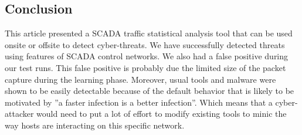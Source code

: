 \documentclass[12pt,journal,compsoc]{IEEEtran}
\begin{document}
\begin{empfile}
%





\section{Conclusion}
This article presented a SCADA traffic statistical analysis tool that can be used onsite or offsite to detect cyber-threats. We have successfully detected threats using features of SCADA control networks. We also had a false positive during our test runs. This false positive is probably due the limited size of the packet capture during the learning phase. Moreover, usual tools and malware were shown to be easily detectable because of the default behavior that is likely to be motivated by ''a faster infection is a better infection''. Which means that a cyber-attacker would need to put a lot of effort to modify existing tools to minic the way hosts are interacting on this specific network.


\end{empfile}
\end{document}

